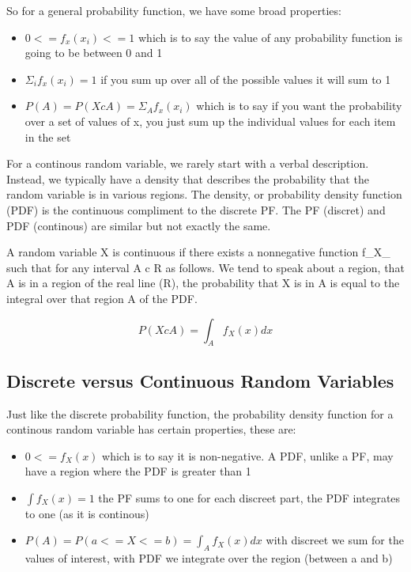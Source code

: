 \documentclass[]{book}
\providecommand{\tightlist}{%
  \setlength{\itemsep}{0pt}\setlength{\parskip}{0pt}}
\theoremstyle{definition}
\theoremstyle{definition}
\theoremstyle{definition}
\theoremstyle{remark}
\begin{document}
So for a general probability function, we have some broad properties:

\begin{itemize}
\tightlist
\item
  \(0 <= f_x(x_i) <= 1\) which is to say the value of any probability
  function is going to be between 0 and 1
\item
  \(Σ_i f_x (x_i) = 1\) if you sum up over all of the possible values it
  will sum to 1
\item
  \(P(A) = P(XcA) = Σ_Af_x(x_i)\) which is to say if you want the
  probability over a set of values of x, you just sum up the individual
  values for each item in the set
\end{itemize}

For a continous random variable, we rarely start with a verbal
description. Instead, we typically have a density that describes the
probability that the random variable is in various regions. The density,
or probability density function (PDF) is the continuous compliment to
the discrete PF. The PF (discret) and PDF (continous) are similar but
not exactly the same.

A random variable X is continuous if there exists a nonnegative function
f\_X\_ such that for any interval A c R as follows. We tend to speak
about a region, that A is in a region of the real line (R), the
probability that X is in A is equal to the integral over that region A
of the PDF.

\[P(X c A) = \int_{A} f_X(x)dx\]

\subsection{Discrete versus Continuous Random
Variables}\label{discrete-versus-continuous-random-variables}

Just like the discrete probability function, the probability density
function for a continous random variable has certain properties, these
are:

\begin{itemize}
\tightlist
\item
  \(0 <= f_X(x)\) which is to say it is non-negative. A PDF, unlike a
  PF, may have a region where the PDF is greater than 1\\
\item
  \(\int f_X(x) = 1\) the PF sums to one for each discreet part, the PDF
  integrates to one (as it is continous)
\item
  \(P(A) = P(a <= X <= b) = \int_{A} f_X(x)dx\) with discreet we sum for
  the values of interest, with PDF we integrate over the region (between
  a and b)
\end{itemize}
\end{document}
